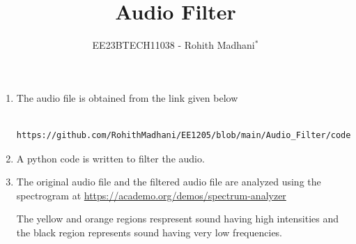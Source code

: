 \documentclass[journal,12pt,twocolumn]{IEEEtran}
\theoremstyle{remark}
\begin{document}

\vspace{3cm}
\title{Audio Filter}
\author{EE23BTECH11038 - Rohith Madhani$^{*}$%
}
\maketitle
\newpage
\bigskip
\renewcommand{\thefigure}{\arabic{figure}}
\renewcommand{\thetable}{\theenumi}


\begin{enumerate}[label=\thesection.\arabic*
,ref=\thesection.\theenumi]

\section{Digital Filter}

\item The audio file is obtained from the link given below
\begin{lstlisting}
    https://github.com/RohithMadhani/EE1205/blob/main/Audio_Filter/codes/Rohith_Singing.wav
\end{lstlisting}

\item 
\label{prob:2.2}
A python code is written to filter the audio.


\item The original audio file and the filtered audio file are analyzed using the spectrogram at \href{https://academo.org/demos/spectrum-analyzer}{\url{https://academo.org/demos/spectrum-analyzer}}

The yellow and orange regions respresent sound having high intensities and the black region represents sound having very low frequencies.


\end{enumerate}
\end{document}
